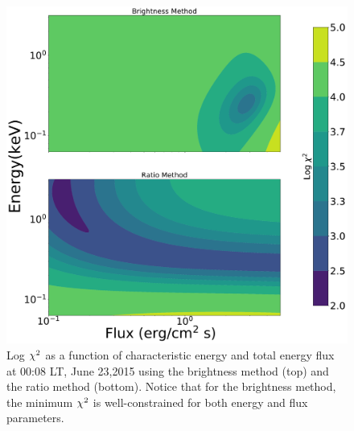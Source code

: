 \documentclass[crop=false,class=mitthesis,oneside,font=12pt]{standalone}
\begin{document}
\begin{figure}[H]
	\centering\includegraphics[width=32pc]{chi_b_vs_e_08.pdf}
	\caption{Log $\rm \chi^2$ as a function of characteristic energy and total energy flux at 00:08 LT, June 23,2015 using the brightness method (top) and the ratio method (bottom). Notice that for the brightness method, the minimum $\rm \chi^2$ is well-constrained for both energy and flux parameters.}
	\label{fig:chi_08}
\end{figure}
\end{document}
